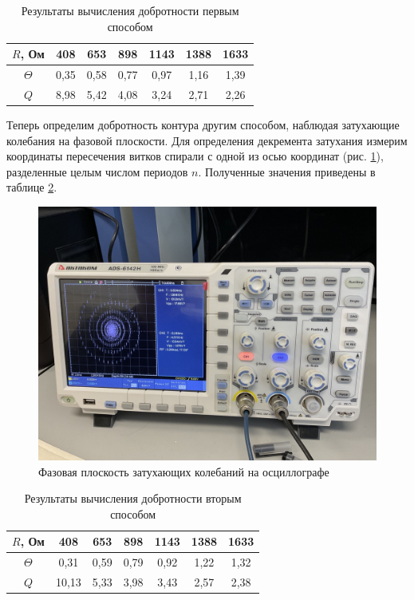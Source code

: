\documentclass[a4paper, 12pt]{article}
\begin{document}
    \begin{table}[H]
        \centering
        \begin{tabular}{|c|c|c|c|c|c|c|}
        \hline
        $R$, Ом & 408 & 653 & 898 & 1143 & 1388 & 1633 \\ \hline
        $\Theta$ & 0,35 & 0,58 & 0,77 & 0,97 & 1,16 & 1,39 \\ \hline
        $Q$ & 8,98 & 5,42 & 4,08 & 3,24 & 2,71 & 2,26 \\ \hline
        \end{tabular}
        \caption{Результаты вычисления добротности первым способом}
        \label{table:Q_1}
    \end{table}

    Теперь определим добротность контура другим способом, наблюдая затухающие колебания на фазовой плоскости. Для определения декремента затухания измерим координаты пересечения витков спирали с одной из осью координат (рис. \ref{osc}), разделенные целым числом периодов $n$. Полученные значения приведены в таблице \ref{table:Q_2}.

    \begin{figure}[H]
        \centering
        \includegraphics[scale = 0.3]{images/osc.jpg}
        \caption{Фазовая плоскость затухающих колебаний на осциллографе}
        \label{osc}
    \end{figure}

    \begin{table}[H]
        \centering
        \begin{tabular}{|c|c|c|c|c|c|c|}
        \hline
        $R$, Ом & 408 & 653 & 898 & 1143 & 1388 & 1633 \\ \hline
        $\Theta$ & 0,31 & 0,59 & 0,79 & 0,92 & 1,22 & 1,32 \\ \hline
        $Q$ & 10,13 & 5,33 & 3,98 & 3,43 & 2,57 & 2,38 \\ \hline
        \end{tabular}
        \caption{Результаты вычисления добротности вторым способом}
        \label{table:Q_2}
    \end{table}
\end{document}
